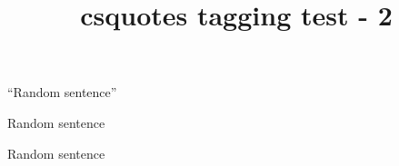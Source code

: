 \documentclass{article}
\title{csquotes tagging test - 2}
\begin{document}
\enquote{Random sentence}



\begin{displayquote}
Random sentence

Random sentence
\end{displayquote}
\end{document}
